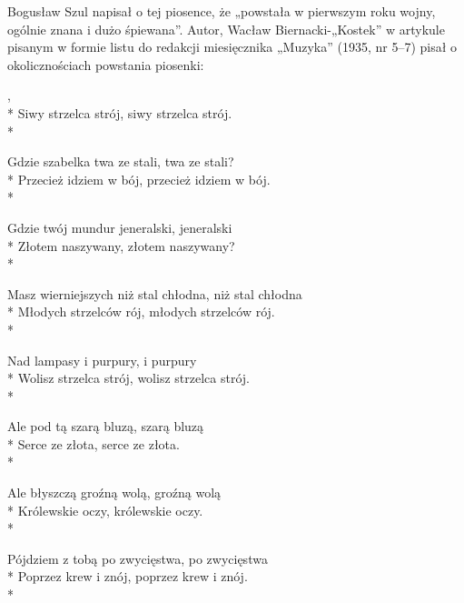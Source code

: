 \begin{info}Bogusław Szul napisał o tej piosence, że „powstała w pierwszym roku wojny, ogólnie znana i dużo śpiewana”. Autor, Wacław Biernacki-„Kostek” w artykule pisanym w formie listu do redakcji miesięcznika „Muzyka” (1935, nr 5–7) pisał o okolicznościach powstania piosenki:\end{info}

\begin{lyrics}[longestline={Masz wierniejszych niż stal chłodna, niż stal chłodna}]

,\\*
Siwy strzelca strój, siwy strzelca strój.\\*

Gdzie szabelka twa ze stali, twa ze stali?\\*
Przecież idziem w bój, przecież idziem w bój.\\*

Gdzie twój mundur jeneralski, jeneralski\\*
Złotem naszywany, złotem naszywany?\\*

Masz wierniejszych niż stal chłodna, niż stal chłodna\\*
Młodych strzelców rój, młodych strzelców rój.\\*

Nad lampasy i purpury, i purpury\\*
Wolisz strzelca strój, wolisz strzelca strój.\\*

Ale pod tą szarą bluzą, szarą bluzą\\*
Serce ze złota, serce ze złota.\\*

Ale błyszczą groźną wolą, groźną wolą\\*
Królewskie oczy, królewskie oczy.\\*

Pójdziem z tobą po zwycięstwa, po zwycięstwa\\*
Poprzez krew i znój, poprzez krew i znój.\\*
\end{lyrics}



